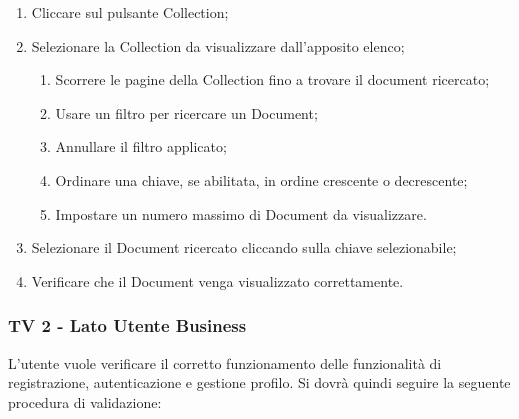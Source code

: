 \begin{enumerate}
\item Cliccare sul pulsante Collection;
\item Selezionare la Collection da visualizzare dall'apposito elenco;
\begin{enumerate}
\item Scorrere le pagine della Collection fino a trovare il document ricercato;
\item Usare un filtro per ricercare un Document;
\item Annullare il filtro applicato;
\item Ordinare una chiave, se abilitata, in ordine crescente o decrescente;
\item Impostare un numero massimo di Document da visualizzare.
\end{enumerate}
\item Selezionare il Document ricercato cliccando sulla chiave selezionabile;
\item Verificare che il Document venga visualizzato correttamente.
\end{enumerate}

\subsubsection{TV 2 - Lato Utente Business}
L’utente vuole verificare il corretto funzionamento delle funzionalità di registrazione, autenticazione e gestione profilo.
Si dovrà quindi seguire la seguente procedura di validazione:

